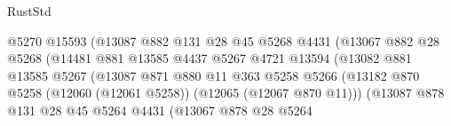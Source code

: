 \begin{lexlean}{RustStd}
\begin{coremodule}
                                          @5270
                                          @15593
                                          (@13087
                                            @882
                                            @131
                                            @28
                                            @45
                                            @5268
                                            @4431
                                            (@13067
                                              @882
                                              @28
                                              @5268
                                              (@14481
                                                @881
                                                @13585
                                                @4437
                                                @5267
                                                @4721
                                                @13594
                                                (@13082
                                                  @881
                                                  @13585
                                                  @5267
                                                  (@13087
                                                    @871
                                                    @880
                                                    @11
                                                    @363
                                                    @5258
                                                    @5266
                                                    (@13182
                                                      @870
                                                      @5258
                                                      (@12060 (@12061 @5258))
                                                      (@12065 (@12067 @870 @11)))
                                                    (@13087
                                                      @878
                                                      @131
                                                      @28
                                                      @45
                                                      @5264
                                                      @4431
                                                      (@13067
                                                        @878
                                                        @28
                                                        @5264

\end{coremodule}
\end{lexlean}
